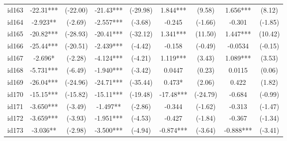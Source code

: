 \documentclass[entropy,article,submit,moreauthors,LaTeX and dvi2pdf]{Definitions/mdpi}
\begin{document}
\begin{center}
\begin{longtable}{ccccccccc}
id163                                         & -22.31***     & (-22.00)      & -21.43***       & (-29.98)         & 1.844***          & (9.58)            & 1.656***          & (8.12)            \\
id164                                         & -2.923**      & (-2.69)       & -2.557***       & (-3.68)          & -0.245            & (-1.66)           & -0.301            & (-1.85)           \\
id165                                         & -20.82***     & (-28.93)      & -20.41***       & (-32.12)         & 1.341***          & (11.50)           & 1.447***          & (10.42)           \\
id166                                         & -25.44***     & (-20.51)      & -2.439***       & (-4.42)          & -0.158            & (-0.49)           & -0.0534           & (-0.15)           \\
id167                                         & -2.696*       & (-2.28)       & -4.124***       & (-4.21)          & 1.119***          & (3.43)            & 1.089***          & (3.53)            \\
id168                                         & -5.731***     & (-6.49)       & -1.940***       & (-3.42)          & 0.0447            & (0.23)            & 0.0115            & (0.06)            \\
id169                                         & -26.04***     & (-24.96)      & -24.71***       & (-35.44)         & 0.473*            & (2.06)            & 0.422             & (1.82)            \\
id170                                         & -15.15***     & (-15.82)      & -15.11***       & (-19.48)         & -17.48***         & (-24.79)          & -0.684            & (-0.99)           \\
id171                                         & -3.650***     & (-3.49)       & -1.497**        & (-2.86)          & -0.344            & (-1.62)           & -0.313            & (-1.47)           \\
id172                                         & -3.659***     & (-3.93)       & -1.951***       & (-4.53)          & -0.427            & (-1.84)           & -0.367            & (-1.34)           \\
id173                                         & -3.036**      & (-2.98)       & -3.500***       & (-4.94)          & -0.874***         & (-3.64)           & -0.888***         & (-3.41)           \\

\end{longtable}
\end{center}
\end{document}
